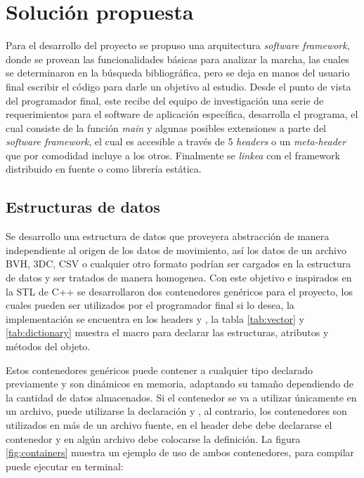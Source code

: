 \chapter{Solución propuesta}

Para el desarrollo del proyecto se propuso una arquitectura \emph{software framework}, donde se provean las funcionalidades básicas para analizar la marcha, las cuales se determinaron en la búsqueda bibliográfica, pero se deja en manos del usuario final escribir el código para darle un objetivo al estudio. Desde el punto de vista del programador final, este recibe del equipo de investigación una serie de requerimientos para el software de aplicación específica, desarrolla el programa, el cual consiste de la función \emph{main} y algunas posibles extensiones a parte del \emph{software framework}, el cual es accesible a través de 5 \emph{headers} o un \emph{meta-header} que por comodidad incluye a los otros. Finalmente se \emph{linkea} con el framework distribuido en fuente o como librería estática. 

\section{Estructuras de datos}

Se desarrollo una estructura de datos que proveyera abstracción de manera independiente al origen de los datos de movimiento, así los datos de un archivo BVH, 3DC, CSV o cualquier otro formato podrían ser cargados en la estructura de datos y ser tratados de manera homogenea. Con este objetivo e inspirados en la STL de C++ se desarrollaron dos contenedores genéricos para el proyecto, los cuales pueden ser utilizados por el programador final si lo desea, la implementación se encuentra en los headers  y , la tabla \ref{tab:vector} y \ref{tab:dictionary} muestra el macro para declarar las estructuras, atributos y métodos del objeto. 

Estos contenedores genéricos puede contener a cualquier tipo declarado previamente y son dinámicos en memoria, adaptando su tamaño dependiendo de la cantidad de datos almacenados. Si el contenedor se va a utilizar únicamente en un archivo, puede utilizarse la declaración  y , al contrario, los contenedores son utilizados en más de un archivo fuente, en el header debe debe declararse el contenedor y en algún archivo debe colocarse la definición. La figura \ref{fig:containers} muestra un ejemplo de uso de ambos contenedores, para compilar puede ejecutar en terminal:

